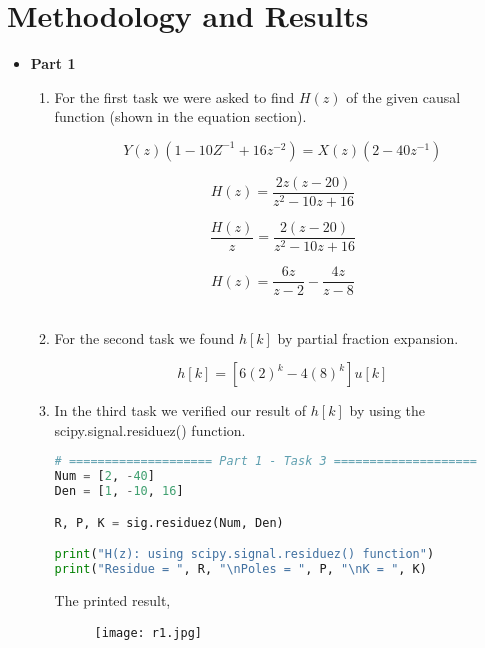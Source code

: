 \documentclass[12pt,a4paper]{article}
\begin{document}
\section{Methodology and Results}\label{sec:meth}

\begin{itemize}

\item \textbf{Part 1}\\
\begin{enumerate}

    \item
    For the first task we were asked to find $H(z)$ of the given causal function (shown in the equation section). 
    
    $$Y(z)(1 - 10Z^{-1} + 16z^{-2}) = X(z)(2 - 40z^{-1})$$
    
    $$H(z) = \frac{2z(z-20)}{z^2 - 10z +16}$$
    
    $$\frac{H(z)}{z} = \frac{2(z-20)}{z^2 - 10z +16}$$
    
    $$H(z) = \frac{6z}{z-2} - \frac{4z}{z-8}$$\\

    \item 
    For the second task we found $h[k]$ by partial fraction expansion.
    
    $$h[k] = [6(2)^k - 4(8)^k]u[k]$$
\clearpage

    \item
    In the third task we verified our result of $h[k]$ by using the scipy.signal.residuez() function.

\begin{lstlisting}[language=Python, caption={Task 3, Part 1}, label={lst:code}, mathescape=true, breaklines=true]
# ==================== Part 1 - Task 3 ====================
Num = [2, -40]
Den = [1, -10, 16]

R, P, K = sig.residuez(Num, Den)

print("H(z): using scipy.signal.residuez() function")
print("Residue = ", R, "\nPoles = ", P, "\nK = ", K)
\end{lstlisting}

The printed result,

\begin{figure}[h]
    \centering
    \texttt{[image: r1.jpg]}
\end{figure}\textbf{}


\end{enumerate}
\end{itemize}
\end{document}
